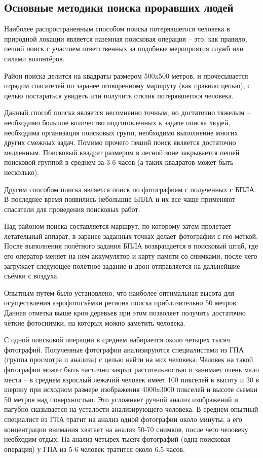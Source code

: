 \subsection{Основные методики поиска проравших людей}

Наиболее распространенным способом поиска потерявшегося человека в природной локации является наземная поисковая операция -- это, как правило, пеший поиск с участием ответственных за подобные мероприятия служб или силами волонтёров. 

Район поиска делится на квадраты размером 500x500 метров, и прочесывается отрядом спасателей по заранее оговоренному маршруту (как правило цепью), с целью постараться увидеть или получить отклик потерявшегося человека. 

Данный способ поиска является несомненно точным, но достаточно тяжелым -- необходимо большое количество подготовленных к задаче поиска людей, необходима организация поисковых групп, необходимо выполнение многих других смежных задач. Помимо прочего пеший поиск является достаточно медленным. Поисковый квадрат размером в лесной зоне закрывается пешей поисковой группой в среднем за 3-6 часов (а таких квадратов может быть несколько).


Другим способом поиска является поиск по фотографиям с полученных с БПЛА. В последнее время появились небольшие БПЛА и их все чаще применяют спасатели для проведения поисковых работ. 

Над районом поиска составляется маршрут, по которому затем пролетает летательный аппарат, в заранее заданных точках делает фотографии с гео-меткой. После выполнения полётного задания БПЛА возвращается в поисковый штаб, где его оператор меняет на нём аккумулятор и карту памяти со снимками, после чего загружает следующее полётное задание и дрон отправляется на дальнейшие съёмки с воздуха.

Опытным путём было установлено, что наиболее оптимальная высота для осуществления аэрофотосъёмки региона поиска приблизительно 50 метров. Данная отметка выше крон деревьев при этом позволяет получить достаточно чёткие фотоснимки, на которых можно заметить человека.


С одной поисковой операции в среднем набирается около четырех тысяч фотографий. Полученные фотографии анализируются специалистами из ГПА (группа просмотра и анализа) с целью найти на них человека. Человек на такой фотографии может быть частично закрыт растительностью и занимает очень мало места -- в среднем взрослый лежачий человек имеет 100 пикселей в высоту и 30 в шерину при исходном размере изображения 4000x3000 пикселей и высоте сьемки 50 метров над поверхностью. Это усложняет ручной анализ изображений и пагубно сказывается на усталости анализирующего человека. В среднем опытный специалист из ГПА тратит на анализ одной фотографии около минуты, а его концентрации внимания хватает на анализ 50-70 снимков, после чего человеку необходим отдых. На анализ четырех тысяч фотографий (одна поисковая операция) у ГПА из 5-6 человек тратится около 6.5 часов.
